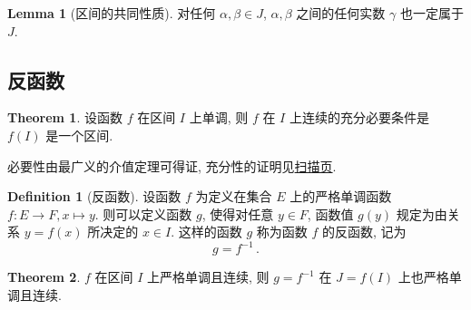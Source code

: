 \documentclass{book}
\numberwithin{equation}{section}
\numberwithin{figure}{section}
\theoremstyle{definition}
\newtheorem{definition}{Definition}
\newtheorem{theorem}{Theorem}[section]
\newtheorem{lemma}{Lemma}[section]
\begin{document}
\begin{lemma}[区间的共同性质]
  对任何 $\alpha,\beta\in J$, $\alpha,\beta$ 之间的任何实数 $\gamma$ 也一定属于 $J$.
\end{lemma}
\subsection{反函数}
\begin{theorem}
  设函数 $f$ 在区间 $I$ 上单调, 则 $f$ 在 $I$ 上连续的充分必要条件是 $f(I)$ 是一个区间.
\end{theorem}
必要性由最广义的介值定理可得证, 充分性的证明见\hyperlink{scan:dandiao}{扫描页}.

\begin{definition}[反函数]
  设函数 $f$ 为定义在集合 $E$ 上的严格单调函数 $f:E\to F,x\mapsto y$.
  则可以定义函数 $g$, 使得对任意 $y\in F$, 函数值 $g(y)$ 规定为由关系 $y=f(x)$ 所决定的 $x\in I$. 这样的函数 $g$ 称为函数 $f$ 的反函数, 记为
  \begin{equation*}
    g=f^{-1}\,.
  \end{equation*}
\end{definition}

\begin{theorem}
  $f$ 在区间 $I$ 上严格单调且连续, 则 $g=f^{-1}$ 在 $J=f(I)$ 上也严格单调且连续.
\end{theorem}
\end{document}
